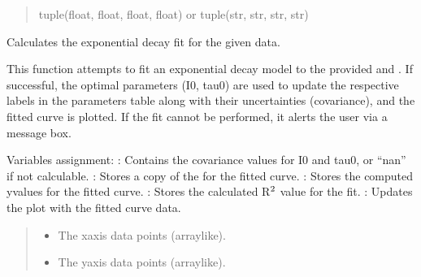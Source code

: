 \documentclass[letterpaper,10pt,english]{sphinxmanual}
\begin{document}
\begin{fulllineitems}
\begin{fulllineitems}
\begin{quote}
\begin{description}
\sphinxAtStartPar
tuple(float, float, float, float) or tuple(str, str, str, str)

\end{description}\end{quote}

\end{fulllineitems}


\begin{fulllineitems}
\label{\detokenize{FLIMGraphics:FLIMGraphics.FLIMGraphic.fitExpDecay}}
\pysigstartsignatures
{}
\pysigstopsignatures
\sphinxAtStartPar
Calculates the exponential decay fit for the given data.

\sphinxAtStartPar
This function attempts to fit an exponential decay model to the provided  and . If successful,
the optimal parameters (I0, tau0) are used to update the respective labels in the parameters table along with
their uncertainties (covariance), and the fitted curve is plotted. If the fit cannot be performed, it alerts
the user via a message box.

\sphinxAtStartPar
Variables assignment:
\sphinxhyphen{} : Contains the covariance values for I0 and tau0, or “nan” if not calculable.
\sphinxhyphen{} : Stores a copy of the  for the fitted curve.
\sphinxhyphen{} : Stores the computed y\sphinxhyphen{}values for the fitted curve.
\sphinxhyphen{} : Stores the calculated R\(\sp{\text{2}}\) value for the fit.
\sphinxhyphen{} : Updates the plot with the fitted curve data.
\begin{quote}\begin{description}
\begin{itemize}
\item {} 
\sphinxAtStartPar
{} \textendash{} The x\sphinxhyphen{}axis data points (array\sphinxhyphen{}like).

\item {} 
\sphinxAtStartPar
{} \textendash{} The y\sphinxhyphen{}axis data points (array\sphinxhyphen{}like).


\end{itemize}
\end{description}
\end{quote}
\end{fulllineitems}
\end{fulllineitems}
\end{document}
